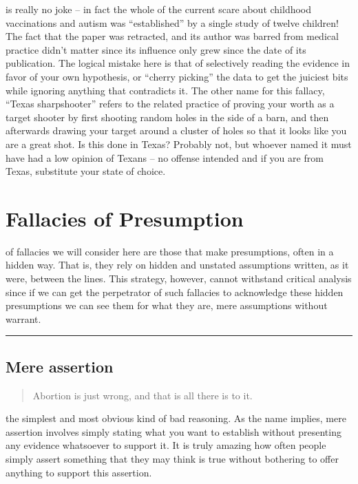 \documentclass[justified]{tufte-book}
\newenvironment{argument}{\begin{quote}\normalsize}{\end{quote}}
\begin{document}
 is really no joke -- in fact the whole of the current scare about childhood vaccinations and autism was ``established'' by a single study of twelve children! The fact that the paper was retracted, and its author was barred from medical practice didn't matter since its influence only grew since the date of its publication. The logical mistake here is that of selectively reading the evidence in favor of your own hypothesis, or ``cherry picking'' the data to get the juiciest bits while ignoring anything that contradicts it. The other name for this fallacy, ``Texas sharpshooter'' refers to the related practice of proving your worth as a target shooter by first shooting random holes in the side of a barn, and then afterwards drawing your target around a cluster of holes so that it looks like you are a great shot. Is this done in Texas? Probably not, but whoever named it must have had a low opinion of Texans -- no offense intended and if you are from Texas, substitute your state of choice.

\hypertarget{fallacies-of-presumption}{%
\section{Fallacies of Presumption}\label{fallacies-of-presumption}}

 of fallacies we will consider here are those that make presumptions, often in a hidden way. That is, they rely on hidden and unstated assumptions written, as it were, between the lines. This strategy, however, cannot withstand critical analysis since if we can get the perpetrator of such fallacies to acknowledge these hidden presumptions we can see them for what they are, mere assumptions without warrant.

\begin{center}\rule{0.5\linewidth}{\linethickness}\end{center}

\hypertarget{mere-assertion}{%
\subsection*{Mere assertion}\label{mere-assertion}}

\begin{argument}
Abortion is just wrong, and that is all there is to it.
\end{argument}

 the simplest and most obvious kind of bad reasoning. As the name implies, mere assertion involves simply stating what you want to establish without presenting any evidence whatsoever to support it. It is truly amazing how often people simply assert something that they may think is true without bothering to offer anything to support this assertion.
\end{document}

